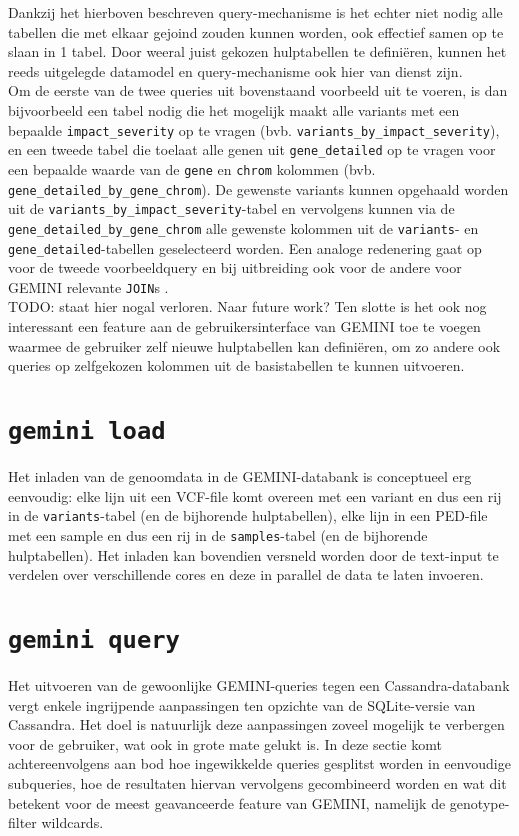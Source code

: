

Dankzij het hierboven beschreven query-mechanisme is het echter niet nodig alle tabellen die met elkaar gejoind zouden kunnen worden, ook effectief samen op te slaan in 1 tabel. Door weeral juist gekozen hulptabellen te defini\"eren, kunnen het reeds uitgelegde datamodel en query-mechanisme ook hier van dienst zijn.\\
Om de eerste van de twee queries uit bovenstaand voorbeeld uit te voeren, is dan bijvoorbeeld een tabel nodig die het mogelijk maakt alle variants met een bepaalde \texttt{impact\_severity} op te vragen (bvb. \texttt{variants\_by\_impact\_severity}), en een tweede tabel die toelaat alle genen uit \texttt{gene\_detailed} op te vragen voor een bepaalde waarde van de \texttt{gene} en \texttt{chrom} kolommen (bvb. \texttt{gene\_detailed\_by\_gene\_chrom}). De gewenste variants kunnen opgehaald worden uit de \texttt{variants\_by\_impact\_severity}-tabel en vervolgens kunnen via de \texttt{gene\_detailed\_by\_gene\_chrom} alle gewenste kolommen uit de \texttt{variants}- en \texttt{gene\_detailed}-tabellen geselecteerd worden. Een analoge redenering gaat op voor de tweede voorbeeldquery en bij uitbreiding ook voor de andere voor GEMINI relevante \texttt{JOIN}s \cite{gemini_joins}.\\

{\color{red} TODO: staat hier nogal verloren. Naar future work?} Ten slotte is het ook nog interessant een feature aan de gebruikersinterface van GEMINI toe te voegen waarmee de gebruiker zelf nieuwe hulptabellen kan defini\"eren, om zo andere ook queries op zelfgekozen kolommen uit de basistabellen te kunnen uitvoeren.

\section{\texttt{gemini load}}

Het inladen van de genoomdata in de GEMINI-databank is conceptueel erg eenvoudig: elke lijn uit een VCF-file komt overeen met een variant en dus een rij in de \texttt{variants}-tabel (en de bijhorende hulptabellen), elke lijn in een PED-file met een sample en dus een rij in de \texttt{samples}-tabel (en de bijhorende hulptabellen). Het inladen kan bovendien versneld worden door de text-input te verdelen over verschillende cores en deze in parallel de data te laten invoeren.

\section{\texttt{gemini query}}
\label{gemini_query_concept}
Het uitvoeren van de gewoonlijke GEMINI-queries tegen een Cassandra-databank vergt enkele ingrijpende aanpassingen ten opzichte van de SQLite-versie van Cassandra. Het doel is natuurlijk deze aanpassingen zoveel mogelijk te verbergen voor de gebruiker, wat ook in grote mate gelukt is. In deze sectie komt achtereenvolgens aan bod hoe ingewikkelde queries gesplitst worden in eenvoudige subqueries, hoe de resultaten hiervan vervolgens gecombineerd worden en wat dit betekent voor de meest geavanceerde feature van GEMINI, namelijk de genotype-filter wildcards.

